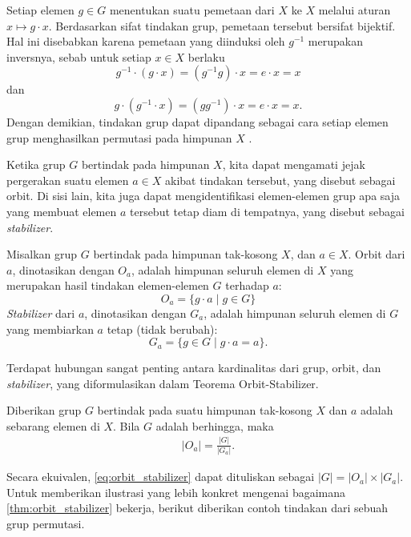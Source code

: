 Setiap elemen $g\in G$ menentukan suatu pemetaan dari $X$ ke $X$ melalui aturan
$
  x\mapsto g\cdot x.
$
Berdasarkan sifat tindakan grup, pemetaan tersebut bersifat bijektif. Hal ini disebabkan karena pemetaan yang diinduksi oleh $g^{-1}$ merupakan inversnya, sebab untuk setiap $x\in X$ berlaku
\[
  g^{-1}\cdot(g\cdot x)=(g^{-1}g)\cdot x=e\cdot x=x
\]
dan
\[
  g\cdot(g^{-1}\cdot x)=(gg^{-1})\cdot x=e\cdot x=x.
\]
Dengan demikian, tindakan grup dapat dipandang sebagai cara setiap elemen grup menghasilkan permutasi pada himpunan $X$ \parencite{subiono2022aljabar}.

Ketika grup $G$ bertindak pada himpunan $X$, kita dapat mengamati jejak pergerakan suatu elemen $a \in X$ akibat tindakan tersebut, yang disebut sebagai orbit. Di sisi lain, kita juga dapat mengidentifikasi elemen-elemen grup apa saja yang membuat elemen $a$ tersebut tetap diam di tempatnya, yang disebut sebagai \emph{stabilizer}.

\begin{definisi}\label{def:orbit_stabilizer}
  Misalkan grup $G$ bertindak pada himpunan tak-kosong $X$, dan $a \in X$.
  Orbit dari $a$, dinotasikan dengan $O_a$, adalah himpunan seluruh elemen di $X$ yang merupakan hasil tindakan elemen-elemen $G$ terhadap $a$:
  \[
    O_a = \{ g\cdot a \mid g \in G \}
  \]
  \emph{Stabilizer} dari $a$, dinotasikan dengan $G_a$, adalah himpunan seluruh elemen di $G$ yang membiarkan $a$ tetap (tidak berubah):
  \[
    G_a = \{ g \in G \mid g\cdot a = a \}.
  \]
\end{definisi}

Terdapat hubungan sangat penting antara kardinalitas dari grup, orbit, dan \emph{stabilizer}, yang diformulasikan dalam Teorema Orbit-Stabilizer.

\begin{teorema}\label{thm:orbit_stabilizer}
  Diberikan grup $G$ bertindak pada suatu himpunan tak-kosong $X$ dan $a$ adalah sebarang elemen di $X$. Bila $G$ adalah berhingga, maka
  \begin{align}\label{eq:orbit_stabilizer}
    |O_a|=\frac{|G|}{|G_a|}.
  \end{align}
\end{teorema}
Secara ekuivalen, \eqref{eq:orbit_stabilizer} dapat dituliskan sebagai $|G|=|O_a|\times |G_a|$. Untuk memberikan ilustrasi yang lebih konkret mengenai bagaimana \autoref{thm:orbit_stabilizer} bekerja, berikut diberikan contoh tindakan dari sebuah grup permutasi.

